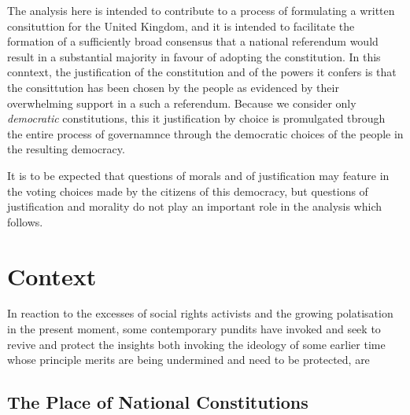\documentclass[10pt,titlepage]{book}
\begin{document}
  The analysis here is intended to contribute to a process of formulating a written consituttion for the United Kingdom, and it is intended to facilitate the formation of a sufficiently broad consensus that a national referendum would result in a substantial majority in favour of adopting the constitution.
  In this conntext, the justification of the constitution and of the powers it confers is that the consittution has been chosen by the people as evidenced by their overwhelming support in a such a referendum.
  Because we consider only {\it democratic} constitutions, this {it justification by choice} is promulgated tbrough the entire process of governamnce through the democratic choices of the people in the resulting democracy.

  It is to be expected that questions of morals and of justification may feature in the voting choices made by the citizens of this democracy, but questions of justification and morality do not play an important role in the analysis which follows.

\chapter{Context}\label{Context}

\cite{berlin91}

In reaction to the excesses of social rights activists and the growing polatisation in the present moment, some contemporary pundits have invoked and seek to revive and protect the insights both invoking the ideology of some earlier time whose principle merits are being undermined and need to be protected, are

\section{The Place of National Constitutions}


\chapter{}

{}








\end{document}
